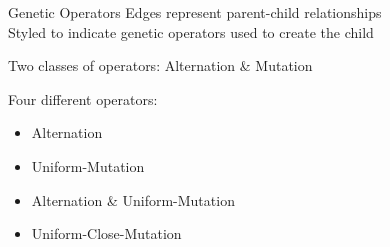 \documentclass{beamer}
\begin{document}
\begin{frame}{Genetic Operators}
Edges represent parent-child relationships
\\
\vspace{.75em}
Styled to indicate genetic operators used to create the child
\\
\vspace{.75em}

Two classes of operators: Alternation \& Mutation
\\
\vspace{.75em}

Four different operators:
\begin{itemize}
\item Alternation %
\item Uniform-Mutation %
\item Alternation \& Uniform-Mutation
\item Uniform-Close-Mutation %
\end{itemize} 
\end{frame}
\end{document}
